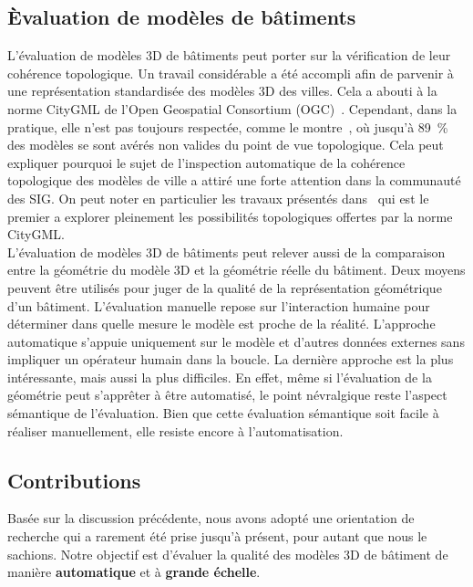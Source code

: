     \subsection*{\`Evaluation de modèles de bâtiments}
        L'évaluation de modèles 3D de bâtiments peut porter sur la vérification de leur cohérence topologique.
        Un travail considérable a été accompli afin de parvenir à une représentation standardisée des modèles 3D des villes.
        Cela a abouti à la norme CityGML de l'Open Geospatial Consortium (OGC)~\parencite{groger2012citygml}.
        Cependant, dans la pratique, elle n'est pas toujours respectée, comme le montre~\parencite{biljecki2016most}, où jusqu'à \SI{89}{\percent} des modèles se sont avérés non valides du point de vue topologique.
        Cela peut expliquer pourquoi le sujet de l'inspection automatique de la cohérence topologique des modèles de ville a attiré une forte attention dans la communauté des SIG.
        On peut noter en particulier les travaux présentés dans~\parencite{ledoux2013validation} qui est le premier a explorer pleinement les possibilités topologiques offertes par la norme CityGML.\\

        L'évaluation de modèles 3D de bâtiments peut relever aussi de la comparaison entre la géométrie du modèle 3D et la géométrie réelle du bâtiment.
        Deux moyens peuvent être utilisés pour juger de la qualité de la représentation géométrique d'un bâtiment.
        L'évaluation manuelle repose sur l'interaction humaine pour déterminer dans quelle mesure le modèle est proche de la réalité.
        L'approche automatique s'appuie uniquement sur le modèle et d'autres données externes sans impliquer un opérateur humain dans la boucle.
        La dernière approche est la plus intéressante, mais aussi la plus difficiles.
        En effet, même si l'évaluation de la géométrie peut s'apprêter à être automatisé, le point névralgique reste l'aspect sémantique de l'évaluation.
        Bien que cette évaluation sémantique soit facile à réaliser manuellement, elle resiste encore à l'automatisation.

    \subsection*{Contributions}
        Basée sur la discussion précédente, nous avons adopté une orientation de recherche qui a rarement été prise jusqu'à présent, pour autant que nous le sachions.
        Notre objectif est d'évaluer la qualité des modèles 3D de bâtiment de manière \textbf{automatique} et à \textbf{grande échelle}.

